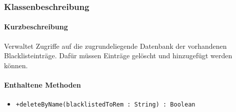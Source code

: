 \subsubsection*{Klassenbeschreibung}%
\paragraph*{Kurzbeschreibung}
Verwaltet Zugriffe auf die zugrundeliegende Datenbank der vorhandenen Blacklisteinträge.
Dafür müssen Einträge gelöscht und hinzugefügt werden können.
\paragraph*{Enthaltene Methoden}
\begin{itemize}
    \item \texttt{+deleteByName(blacklistedToRem : String) : Boolean}
\end{itemize}
